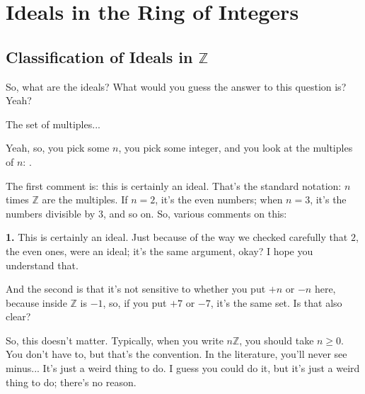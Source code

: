 \section{Ideals in the Ring of Integers}

\subsection{Classification of Ideals in \texorpdfstring{$\mathbb{Z}$}{Z}}

\begin{speech}[00:47:40 - 00:47:46]
So, what are the ideals?  What would you guess the answer to this question is? Yeah?
\end{speech}

\begin{student}
The set of multiples...
\end{student}

\begin{speech}[00:47:48 - 00:49:02]
Yeah, so, you pick some $n$,  you pick some integer, and you look at the multiples of $n$: .

The first comment is: this is certainly an ideal.  That's the standard notation: $n$ times $\mathbb{Z}$ are the multiples. If $n = 2$, it's the even numbers; when $n = 3$, it's the numbers divisible by $3$, and so on. So, various comments on this: 

\textbf{1.} This is certainly an ideal. Just because of the way we checked carefully that $2$, the even ones, were an ideal; it's the same argument, okay? I hope you understand that.

And the second is that it's not sensitive to whether you put $+n$ or $-n$ here, because inside $\mathbb{Z}$ is $-1$, so, if you put $+7$ or $-7$, it's the same set. Is that also clear? 

So, this doesn't matter. Typically, when you write $n\mathbb{Z}$,  you should take $n \ge 0$. You don't have to, but that's the convention. In the literature, you'll never see minus... It's just a weird thing to do. I guess you could do it, but it's just a weird thing to do; there's no reason.
\end{speech}

